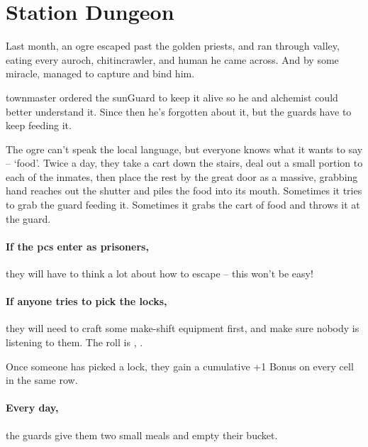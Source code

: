 \prisonMap

\section{Station Dungeon}
\label{stationDungeon}

\begin{multicols}{2}

\begin{exampletext}
  Last month, an ogre escaped past the golden priests, and ran through \gls{valley}, eating every auroch, chitincrawler, and human he came across.
  And by some miracle,  managed to capture and bind him.

  \Gls{townmaster} ordered the \gls{sunGuard} to keep it alive so he and \gls{alchemist} could better understand it.
  Since then he's forgotten about it, but the guards have to keep feeding it.

  The ogre can't speak the local language, but everyone knows what it wants to say -- `food'.
  Twice a day, they take a cart down the stairs, deal out a small portion to each of the inmates, then place the rest by the great door as a massive, grabbing hand reaches out the shutter and piles the food into its mouth.
  Sometimes it tries to grab the guard feeding it.
  Sometimes it grabs the cart of food and throws it at the guard.
\end{exampletext}

\paragraph{If the \glspl{pc} enter as prisoners,}
they will have to think a lot about how to escape -- this won't be easy!

\paragraph{If anyone tries to pick the locks,}
they will need to craft some make-shift equipment first, and make sure nobody is listening to them.
The roll is , \tn[12].

Once someone has picked a lock, they gain a cumulative +1 Bonus on every cell in the same row.

\paragraph{Every day,}
the guards give them two small meals and empty their bucket.


\end{multicols}
